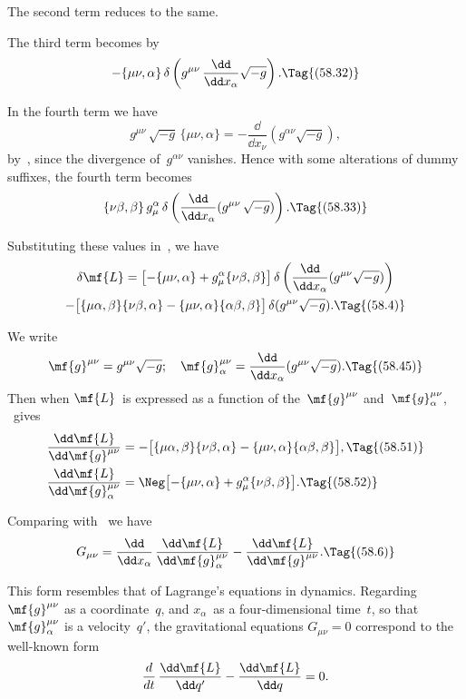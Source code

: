 \documentclass[12pt]{book}
\begin{document}
The second term reduces to the same.

The third term becomes by~
\[
-\{\mu\nu, \alpha\}\, \delta\left(g^{\mu\nu}\, \frac{\dd}{\dd x_{\alpha}} \sqrt{-g}\right).
\Tag{(58.32)}
\]

In the fourth term we have
\[
g^{\mu\nu}\, \sqrt{-g}\, \{\mu\nu, \alpha\}
= -\frac{\dd}{\dd x_{\nu}}(g^{\alpha\nu} \sqrt{-g}),
\]
by~, since the divergence of~$g^{\alpha\nu}$ vanishes. Hence with some alterations
of dummy suffixes, the fourth term becomes
\[
\{\nu\beta, \beta\}\, g_{\mu}^{\alpha}\, \delta\left(\frac{\dd}{\dd x_{\alpha}} (g^{\mu\nu}\, \sqrt{-g})\right).
\Tag{(58.33)}
\]

Substituting these values in~, we have
\begin{multline*}
  \delta\mf{L} = \bigl[-\{\mu\nu, \alpha\} + g_{\mu}^{\alpha} \{\nu\beta, \beta\}\bigr]\,
  \delta\left(\frac{\dd}{\dd x_{\alpha}} (g^{\mu\nu} \sqrt{-g})\right) \\
  - \bigl[\{\mu\alpha, \beta\} \{\nu\beta, \alpha\} - \{\mu\nu, \alpha\} \{\alpha\beta, \beta\}\bigr]\,
  \delta(g^{\mu\nu} \sqrt{-g}).
  \Tag{(58.4)}
\end{multline*}

We write
\[
\mf{g}^{\mu\nu} = g^{\mu\nu} \sqrt{-g};\quad
\mf{g}_{\alpha}^{\mu\nu} = \frac{\dd}{\dd x_{\alpha}} (g^{\mu\nu} \sqrt{-g}).
\Tag{(58.45)}
\]
Then when $\mf{L}$~is expressed as a function of the~$\mf{g}^{\mu\nu}$ and~$\mf{g}_{\alpha}^{\mu\nu}$, ~gives
\begin{align*}
  \frac{\dd\mf{L}}{\dd\mf{g}^{\mu\nu}}
  &= -\bigl[\{\mu\alpha, \beta\} \{\nu\beta, \alpha\} - \{\mu\nu, \alpha\} \{\alpha\beta, \beta\}\bigr],
  \Tag{(58.51)} \\
  \frac{\dd\mf{L}}{\dd\mf{g}_{\alpha}^{\mu\nu}}
  &= \Neg\bigl[-\{\mu\nu, \alpha\} + g_{\mu}^{\alpha} \{\nu\beta, \beta\}\bigr].
  \Tag{(58.52)}
\end{align*}

Comparing with~ we have
\[
G_{\mu\nu} = \frac{\dd}{\dd x_{\alpha}}\, \frac{\dd\mf{L}}{\dd\mf{g}_{\alpha}^{\mu\nu}} - \frac{\dd\mf{L}}{\dd\mf{g}^{\mu\nu}}.
\Tag{(58.6)}
\]

This form resembles that of Lagrange's equations in dynamics. Regarding
%
$\mf{g}^{\mu\nu}$ as a coordinate~$q$, and $x_{\alpha}$~as a four-dimensional time~$t$, so that $\mf{g}_{\alpha}^{\mu\nu}$ is a velocity~$q'$,
the gravitational equations $G_{\mu\nu} = 0$ correspond to the well-known form
\[
\frac{d}{dt}\, \frac{\dd\mf{L}}{\dd q'} - \frac{\dd\mf{L}}{\dd q} = 0.
\]
\end{document}
